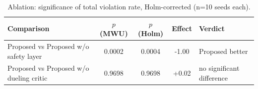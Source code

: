 \begin{table}[t]
\centering
\caption{Ablation: significance of total violation rate, Holm-corrected (n=10 seeds each).}
\label{tab:stats_abl}
\begin{tabular}{lcccl}
\toprule
Comparison & $p$ (MWU) & $p$ (Holm) & Effect & Verdict \\
\midrule
Proposed vs Proposed w/o safety layer & 0.0002 & 0.0004 & -1.00 & Proposed better \\
Proposed vs Proposed w/o dueling critic & 0.9698 & 0.9698 & +0.02 & no significant difference \\
\bottomrule
\end{tabular}
\end{table}